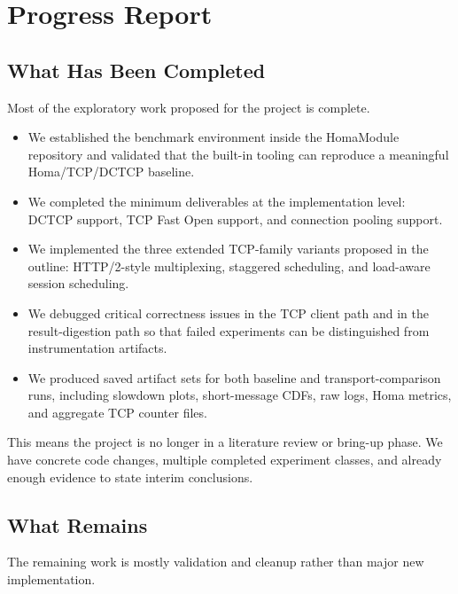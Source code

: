 \documentclass[11pt]{article}
\begin{document}
\section{Progress Report}

\subsection{What Has Been Completed}

Most of the exploratory work proposed for the project is complete.

\begin{itemize}[leftmargin=1.5em]
  \item We established the benchmark environment inside the HomaModule repository and validated that the built-in tooling can reproduce a meaningful Homa/TCP/DCTCP baseline.
  \item We completed the minimum deliverables at the implementation level: DCTCP support, TCP Fast Open support, and connection pooling support.
  \item We implemented the three extended TCP-family variants proposed in the outline: HTTP/2-style multiplexing, staggered scheduling, and load-aware session scheduling.
  \item We debugged critical correctness issues in the TCP client path and in the result-digestion path so that failed experiments can be distinguished from instrumentation artifacts.
  \item We produced saved artifact sets for both baseline and transport-comparison runs, including slowdown plots, short-message CDFs, raw logs, Homa metrics, and aggregate TCP counter files.
\end{itemize}

This means the project is no longer in a literature review or bring-up phase. We have concrete code changes, multiple completed experiment classes, and already enough evidence to state interim conclusions.

\subsection{What Remains}

The remaining work is mostly validation and cleanup rather than major new implementation.
\end{document}
